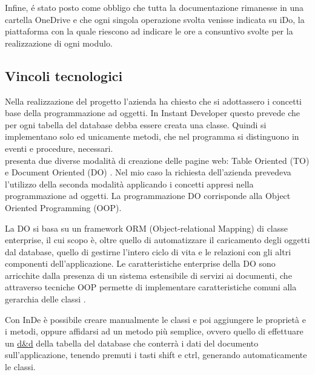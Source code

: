 Infine, é stato posto come obbligo che tutta la documentazione rimanesse in una cartella OneDrive e che ogni singola operazione svolta venisse indicata su iDo, la piattaforma con la quale riescono ad indicare le ore a consuntivo svolte per la realizzazione di ogni modulo.


\subsection{Vincoli tecnologici}\label{vincoliteconlogici}
Nella realizzazione del progetto l'azienda ha chiesto che si adottassero i concetti base della programmazione ad oggetti. In Instant Developer questo prevede che per ogni tabella del database debba essere creata una classe. Quindi si implementano solo ed unicamente metodi, che nel programma si distinguono in eventi e procedure, necessari. \\

\inde presenta due diverse modalità di creazione delle pagine web: Table Oriented (TO)\label{TO} e Document Oriented (DO) \label{DO}. Nel mio caso la richiesta dell'azienda prevedeva l'utilizzo della seconda modalità applicando i concetti appresi nella programmazione ad oggetti. La programmazione DO corrisponde alla Object Oriented Programming (OOP)\label{OOP}.

La DO si basa su un framework ORM (Object-relational Mapping) di classe enterprise, il cui scopo è, oltre quello di automatizzare il caricamento degli oggetti dal database, quello di gestirne l'intero ciclo di vita e le relazioni con gli altri componenti dell'applicazione. Le caratteristiche enterprise della DO sono arricchite dalla presenza di un sistema estensibile di servizi ai documenti, che attraverso tecniche OOP permette di implementare caratteristiche comuni alla gerarchia delle classi \hyperref[bib11]{\cite{[11]}}.

Con InDe è possibile creare manualmente le classi e poi aggiungere le proprietà e i metodi, oppure affidarsi ad un metodo più semplice, ovvero quello di effettuare un \hyperref[draganddrop]{d\&d} della tabella del database che conterrà i dati del documento sull'applicazione, tenendo premuti i tasti shift e ctrl, generando automaticamente le classi. 

